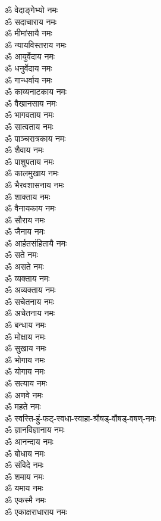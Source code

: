 \begin{multicols}{2}
\begin{flushleft}
ॐ वेदाङ्गेभ्यो नमः\\
ॐ सदाचाराय नमः\\
ॐ मीमांसायै नमः\\
ॐ न्यायविस्तराय नमः\\
ॐ आयुर्वेदाय नमः\\
ॐ धनुर्वेदाय नमः\\
ॐ गान्धर्वाय नमः\\
ॐ काव्यनाटकाय नमः\\
ॐ वैखानसाय नमः\hfill{}\\
ॐ भागवताय नमः\\
ॐ सात्वताय नमः\\
ॐ पाञ्चरात्रकाय नमः\\
ॐ शैवाय नमः\\
ॐ पाशुपताय नमः\\
ॐ कालमुखाय नमः\\
ॐ भैरवशासनाय नमः\\
ॐ शाक्ताय नमः\\
ॐ वैनायकाय नमः\\
ॐ सौराय नमः\hfill{}\\
ॐ जैनाय नमः\\
ॐ आर्हतसंहितायै नमः\\
ॐ सते नमः\\
ॐ असते नमः\\
ॐ व्यक्ताय नमः\\
ॐ अव्यक्ताय नमः\\
ॐ सचेतनाय नमः\\
ॐ अचेतनाय नमः\\
ॐ बन्धाय नमः\\
ॐ मोक्षाय नमः\hfill{}\\
ॐ सुखाय नमः\\
ॐ भोगाय नमः\\
ॐ योगाय नमः\\
ॐ सत्याय नमः\\
ॐ अणवे नमः\\
ॐ महते नमः\\
ॐ स्वस्ति-हुं-फट्-स्वधा-स्वाहा-श्रौषड्-वौषड्-वषण्-नमः\\
ॐ ज्ञानविज्ञानाय नमः\\
ॐ आनन्दाय नमः\\
ॐ बोधाय नमः\hfill{}\\
ॐ संविदे नमः\\
ॐ शमाय नमः\\
ॐ यमाय नमः\\
ॐ एकस्मै नमः\\
ॐ एकाक्षराधाराय नमः\\

\end{flushleft}
\end{multicols}

